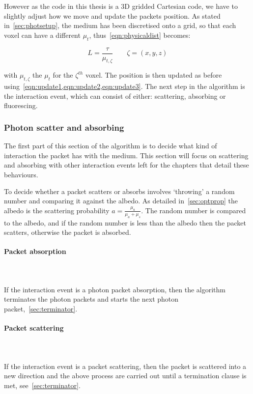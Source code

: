 However as the code in this thesis is a 3D gridded Cartesian code, we have to slightly adjust how we move and update the packets position. As stated in~\cref{sec:photsetup}, the medium has been discretised onto a grid, so that each voxel can have a different $\mu_t$, thus~\cref{eqn:physicaldist} becomes:

\begin{equation}
L=\frac{\tau}{\mu_{t,\zeta}}\quad\quad \zeta=(x,y,z)
\end{equation}

with $\mu_{t,\zeta}$ the $\mu_t$ for the $\zeta^{th}$ voxel. The position is then updated as before using~\cref{eqn:update1,eqn:update2,eqn:update3}. The next step in the algorithm is the interaction event, which can consist of either: scattering, absorbing or fluorescing.

\subsubsection{Photon scatter and absorbing}\label{sec:photscatterabsorb}

The first part of this section of the algorithm is to decide what kind of interaction the packet has with the medium. This section will focus on scattering and absorbing with other interaction events left for the chapters that detail these behaviours.
\medskip

To decide whether a packet scatters or absorbs involves `throwing' a random number and comparing it against the albedo. As detailed in~\cref{sec:optprop} the albedo is the scattering probability $a=\tfrac{\mu_a}{\mu_a+\mu_s}$. The random number is compared to the albedo, and if the random number is less than the albedo then the packet scatters, otherwise the packet is absorbed.

\paragraph{Packet absorption}\hspace{0pt}\\
\\
If the interaction event is a photon packet absorption, then the algorithm terminates the photon packets and starts the next photon packet,~\cref{sec:terminator}.

\paragraph{Packet scattering}\hspace{0pt}\\
\\
If the interaction event is a packet scattering, then the packet is scattered into a new direction and the above process are carried out until a termination clause is met, see~\cref{sec:terminator}.

